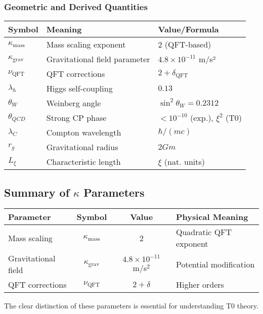 \documentclass[12pt,a4paper]{article}
\begin{document}
	\subsubsection{Geometric and Derived Quantities}
	\begin{longtable}{lll}
		\toprule
		\textbf{Symbol} & \textbf{Meaning} & \textbf{Value/Formula} \\
		\midrule
		$\kappa_{\text{mass}}$ & Mass scaling exponent & $2$ (QFT-based) \\
		$\kappa_{\text{grav}}$ & Gravitational field parameter & $4.8 \times 10^{-11}$ m/s² \\
		$\nu_{\text{QFT}}$ & QFT corrections & $2 + \delta_{\text{QFT}}$ \\
		$\lambda_h$ & Higgs self-coupling & $0.13$ \\
		$\theta_W$ & Weinberg angle & $\sin^2\theta_W = 0.2312$ \\
		$\theta_{QCD}$ & Strong CP phase & $< 10^{-10}$ (exp.), $\xi^2$ (T0) \\
		$\lambda_C$ & Compton wavelength & $\hbar/(mc)$ \\
		$r_g$ & Gravitational radius & $2Gm$ \\
		$L_\xi$ & Characteristic length & $\xi$ (nat. units) \\
		\bottomrule
	\end{longtable}
	
	\subsection{Summary of $\kappa$ Parameters}
	
	\begin{center}
		\begin{tabular}{|l|c|c|l|}
			\hline
			\textbf{Parameter} & \textbf{Symbol} & \textbf{Value} & \textbf{Physical Meaning} \\
			\hline
			Mass scaling & $\kappa_{\text{mass}}$ & 2 & Quadratic QFT exponent \\
			Gravitational field & $\kappa_{\text{grav}}$ & $4.8 \times 10^{-11}$ m/s$^2$ & Potential modification \\
			QFT corrections & $\nu_{\text{QFT}}$ & $2 + \delta$ & Higher orders \\
			\hline
		\end{tabular}
	\end{center}
	
	The clear distinction of these parameters is essential for understanding T0 theory.
	
\end{document}
